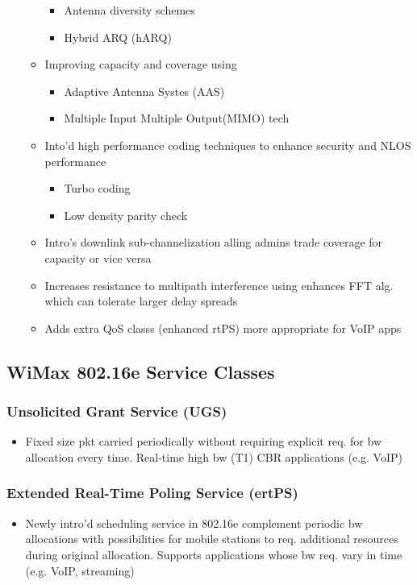 \documentclass[a4paper]{article}
\begin{document}
\begin{itemize}
\begin{itemize}
\begin{itemize}
			\item Antenna diversity schemes
			\item Hybrid ARQ (hARQ)
		\end{itemize}
		\item Improving capacity and coverage using
		\begin{itemize}
			\item Adaptive Antenna Systes (AAS)
			\item Multiple Input Multiple Output(MIMO) tech
		\end{itemize}
		\item Into'd high performance coding techniques to enhance
			security and NLOS performance
		\begin{itemize}
			\item Turbo coding
			\item Low density parity check
		\end{itemize}
		\item Intro's downlink sub-channelization alling admins trade
			coverage for capacity or vice versa
		\item Increases resistance to multipath interference using
			enhances FFT alg. which can tolerate larger delay
			spreads
		\item Adds extra QoS classs (enhanced rtPS) more appropriate for
			VoIP apps
	\end{itemize}
\end{itemize}
\subsection{WiMax 802.16e Service Classes}
\subsubsection{Unsolicited Grant Service (UGS)}
\begin{itemize}
	\item Fixed size pkt carried periodically without requiring explicit
		req. for bw allocation every time. Real-time high bw (T1) CBR
		applications (e.g. VoIP)
\end{itemize}
\subsubsection{Extended Real-Time Poling Service (ertPS)}
\begin{itemize}
	\item Newly intro'd scheduling service in 802.16e complement periodic bw
		allocations with possibilities for mobile stations to req.
		additional resources during original allocation. Supports
		applications whose bw req. vary in time (e.g. VoIP, streaming)
\end{itemize}
\end{document}
